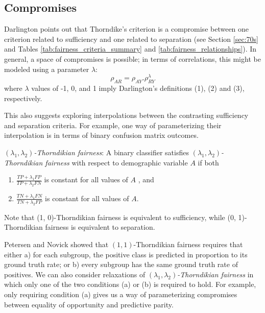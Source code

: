 \documentclass[sigconf,letterpaper,9pt]{acmart}
\begin{document}
\subsection{Compromises}

Darlington \cite{darlington1971another} points out that Thorndike's criterion is a
compromise between one criterion related
to sufficiency and one related to separation (see Section \ref{sec:70s} and Tables \ref{tab:fairness_criteria_summary} and \ref{tab:fairness_relationships}).
In general, a space of compromises is possible; in terms of
correlations, this might be modeled using a parameter $\lambda$: \vspace{-.5em}
%
\begin{equation}
\rho_{AR}=\rho_{AY}.\rho_{RY}^\lambda
\end{equation}
%
where $\lambda$ values of -1, 0, and 1 imply Darlington's definitions (1), (2) and (3), respectively.

This also suggests exploring interpolations between the
contrasting sufficiency and separation criteria. For example,
one way of parameterizing their interpolation is
in terms of binary confusion matrix outcomes.
\vspace{-.75em}
\begin{definition}
{\em $(\lambda_1,\lambda_2)$-Thorndikian
fairness}:
A binary classifier satisfies {\em $(\lambda_1,\lambda_2)$-Thorndikian
fairness}
with respect to demographic variable $A$ if both \vspace{.5em}

\begin{enumerate}
    \item[a)] $\displaystyle\frac{TP+\lambda_1 FP}{TP + \lambda_2 FN}$ is constant for all values of $A$ \vspace{.5em}, and
    \item[b)] $\displaystyle\frac{TN+\lambda_1 FN}{TN + \lambda_2 FP}$ is constant for all values of $A$.
\end{enumerate}
\end{definition}
%
Note that (1, 0)-Thorndikian fairness is equivalent to sufficiency,
while (0, 1)-Thorndikian fairness is equivalent to separation.

Petersen and Novick \cite{petersen1976evaluation} showed that $(1, 1)$-Thorndikian fairness requires that either
a) for each subgroup, the positive class is predicted in proportion to 
its ground truth rate; or b) every subgroup has the same ground truth
rate of positives. We can also consider relaxations of {\em $(\lambda_1,\lambda_2)$-Thorndikian fairness} in which only one of the
two conditions (a) or (b) is required to hold. For example, only requiring
condition (a) gives us a way of parameterizing compromises between equality 
of opportunity and predictive parity.
\end{document}
